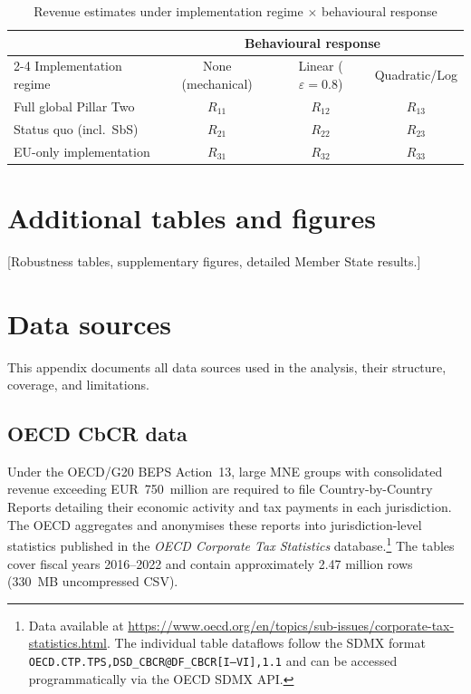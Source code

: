 \documentclass[11pt,a4paper]{article}
\newcommand{\code}[1]{\texttt{#1}}
\begin{document}
\begin{table}[H]
\centering
\caption{Revenue estimates under implementation regime $\times$ behavioural response}
\label{tab:scenario_matrix}
\small
\begin{tabular}{@{}lccc@{}}
\toprule
& \multicolumn{3}{c}{Behavioural response} \\
\cmidrule(l){2-4}
Implementation regime & None (mechanical) & Linear ($\varepsilon = 0.8$) & Quadratic/Log \\
\midrule
Full global Pillar Two & $R_{11}$ & $R_{12}$ & $R_{13}$ \\
Status quo (incl.\ SbS) & $R_{21}$ & $R_{22}$ & $R_{23}$ \\
EU-only implementation & $R_{31}$ & $R_{32}$ & $R_{33}$ \\
\bottomrule
\end{tabular}
\end{table}


\newpage
\section{Additional tables and figures}\label{app:additional}

[Robustness tables, supplementary figures, detailed Member State results.]


\newpage
\section{Data sources}\label{app:data}
\setcounter{table}{0}

This appendix documents all data sources used in the analysis, their structure, coverage, and limitations.

\subsection{OECD CbCR data}\label{app:cbcr}

Under the OECD/G20 BEPS Action~13, large MNE groups with consolidated revenue exceeding EUR~750~million are required to file Country-by-Country Reports detailing their economic activity and tax payments in each jurisdiction. The OECD aggregates and anonymises these reports into jurisdiction-level statistics published in the \emph{OECD Corporate Tax Statistics} database.\footnote{Data available at \url{https://www.oecd.org/en/topics/sub-issues/corporate-tax-statistics.html}. The individual table dataflows follow the SDMX format \code{OECD.CTP.TPS,DSD\_CBCR@DF\_CBCR[I--VI],1.1} and can be accessed programmatically via the OECD SDMX API.} The tables cover fiscal years 2016--2022 and contain approximately 2.47 million rows (330~MB uncompressed CSV).
\end{document}
